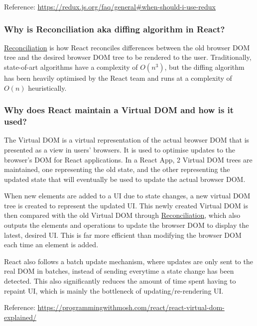 \documentclass[12pt, a4paper]{article}
\begin{document}
Reference: \url{https://redux.js.org/faq/general#when-should-i-use-redux}

\subsubsection*{Why is Reconciliation aka diffing algorithm in React?}
\href{https://reactjs.org/docs/reconciliation.html}{Reconciliation} is how React reconciles differences between the old browser DOM tree and the desired browser DOM tree to be rendered to the user.
Traditionally, state-of-art algorithms have a complexity of \(O(n^{3})\), but the diffing algorithm has been heavily optimised by the React team and runs at a complexity of \(O(n)\) heuristically.

\subsubsection*{Why does React maintain a Virtual DOM and how is it used?}
The Virtual DOM is a virtual representation of the actual browser DOM that is presented as a view in users' browsers.
It is used to optimise updates to the browser's DOM for React applications. 
In a React App, 2 Virtual DOM trees are maintained, one representing the old state, and the other representing the updated state that will eventually be used to update the actual browser DOM.

When new elements are added to a UI due to state changes, a new virtual DOM tree is created to represent the updated UI.
This newly created Virtual DOM is then compared with the old Virtual DOM through \href{https://reactjs.org/docs/reconciliation.html}{Reconciliation}, which also outputs the elements and operations to update the browser DOM to display the latest, desired UI.
This is far more efficient than modifying the browser DOM each time an element is added.

React also follows a batch update mechanism, where updates are only sent to the real DOM in batches, instead of sending everytime a state change has been detected.
This also significantly reduces the amount of time spent having to repaint UI, which is mainly the bottleneck of updating/re-rendering UI.

Reference: \url{https://programmingwithmosh.com/react/react-virtual-dom-explained/}
\end{document}
